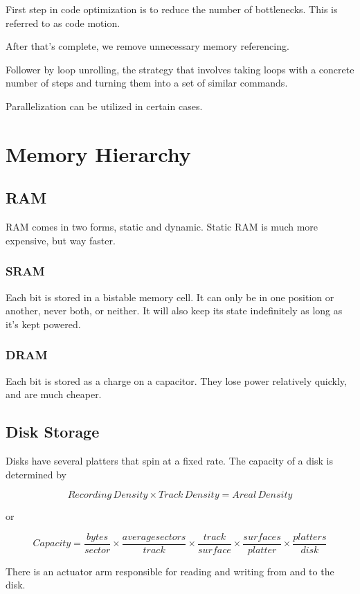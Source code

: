 First step in code optimization is to reduce the number of bottlenecks. This is referred to as code motion.

After that's complete, we remove unnecessary memory referencing.

Follower by loop unrolling, the strategy that involves taking loops with a concrete number of steps and turning them into a set of similar commands.

Parallelization can be utilized in certain cases.

\section{Memory Hierarchy}

    \subsection{RAM}
    RAM comes in two forms, static and dynamic. Static RAM is much more expensive, but way faster.

        \subsubsection{SRAM}
        Each bit is stored in a bistable memory cell. It can only be in one position or another, never both, or neither. It will also keep its state indefinitely as long as it's kept powered.

        \subsubsection{DRAM}
        Each bit is stored as a charge on a capacitor. They lose power relatively quickly, and are much cheaper.

    \subsection{Disk Storage}
    Disks have several platters that spin at a fixed rate. The capacity of a disk is determined by

        \[ Recording \, Density \times Track \, Density = Areal \, Density \]

    or

        \[ Capacity = \frac{bytes}{sector} \times \frac{average sectors}{track} \times \frac{track}{surface} \times \frac{surfaces}{platter} \times \frac{platters}{disk} \]

    There is an actuator arm responsible for reading and writing from and to the disk.

